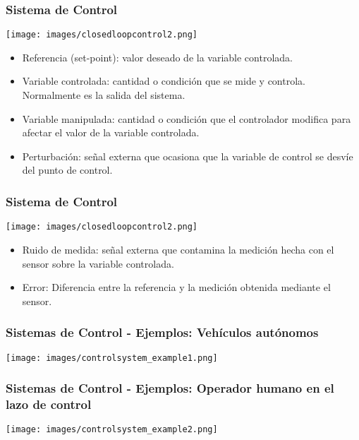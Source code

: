 \documentclass[aspectratio=169,handout]{beamer}
\theoremstyle{definition}
\theoremstyle{plain}
\theoremstyle{remark}
\begin{document}
\begin{frame}[<+->][c]\frametitle{Sistema de Control}
  \vspace*{-0.2cm}
  \begin{center}
    \texttt{[image: images/closedloopcontrol2.png]}
  \end{center}
  \vspace*{-0.7cm}
  \begin{itemize}
    \item Referencia (set-point): valor deseado de la variable controlada.
    \item Variable controlada: cantidad o condición que se mide y controla. Normalmente es la salida del sistema.
    \item Variable manipulada: cantidad o condición que el controlador modifica para afectar el valor de la variable controlada.
    \item Perturbación: señal externa que ocasiona que la variable de control se desvíe del punto de control.
  \end{itemize}
\end{frame}

\begin{frame}[<+->][c]\frametitle{Sistema de Control}
  \vspace*{-0.2cm}
  \begin{center}
    \texttt{[image: images/closedloopcontrol2.png]}
  \end{center}
  \vspace*{-0.7cm}
  \begin{itemize}
    \item Ruido de medida: señal externa que contamina la medición hecha con el sensor sobre la variable controlada.
    \item Error: Diferencia entre la referencia y la medición obtenida mediante el sensor.
  \end{itemize}
\end{frame}

\begin{frame}[c]\frametitle{Sistemas de Control - Ejemplos: Vehículos autónomos}
  \begin{center}
    \texttt{[image: images/controlsystem\_example1.png]}
  \end{center}
\end{frame}

\begin{frame}[c]\frametitle{Sistemas de Control - Ejemplos: Operador humano en el lazo de control}
  \begin{center}
    \texttt{[image: images/controlsystem\_example2.png]}
  \end{center}
\end{frame}
\end{document}
